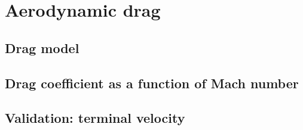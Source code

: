 \section{Aerodynamic drag}\label{sec:aerodynamics}

\subsection{Drag model}
\subsection{Drag coefficient as a function of Mach number}
\subsection{Validation: terminal velocity}
